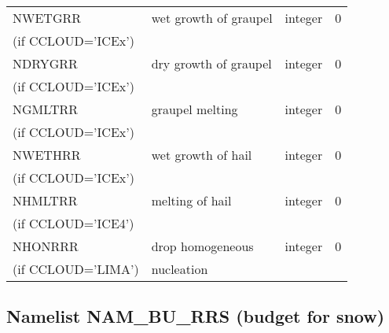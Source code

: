 \begin{center}
\begin{tabular} {|p{8cm}|p{4cm}|>{\centering}p{1.5cm}|p{1.5cm}<{\centering}|}
NWETGRR  & wet growth of graupel & integer  &  0 \index{NWETGRR!\innam{NAM\_BU\_RRR}}\\
(if CCLOUD='ICEx') & &   &  \\\hline
NDRYGRR  & dry growth of graupel & integer  &  0 \index{NDRYGRR!\innam{NAM\_BU\_RRR}}\\
(if CCLOUD='ICEx') & &   &  \\\hline
NGMLTRR  & graupel melting& integer  &  0 \index{NGMLTRR!\innam{NAM\_BU\_RRR}}\\
(if CCLOUD='ICEx') & &   &  \\\hline
NWETHRR  & wet growth of hail & integer  &  0 \index{NWETHRR!\innam{NAM\_BU\_RRR}}\\
(if CCLOUD='ICEx') & &   &  \\\hline
NHMLTRR  & melting of hail& integer  &  0 \index{NHMLTRR!\innam{NAM\_BU\_RRR}}\\
(if CCLOUD='ICE4') & &   &  \\\hline
NHONRRR  & drop homogeneous  & integer  &  0 \index{NHONRRR!\innam{NAM\_BU\_RRR}}\\
(if CCLOUD='LIMA') &nucleation &   &  \\\hline\end{tabular}
\end{center}
\subsection{Namelist NAM\_BU\_RRS (budget for snow)}

